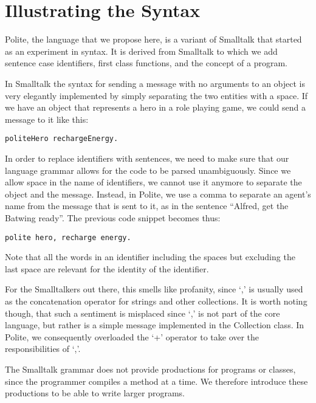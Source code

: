 
\section{Illustrating the Syntax}

Polite, the language that we propose here, is a variant of Smalltalk that started as an experiment in syntax. It is derived from Smalltalk to which we add sentence case identifiers, first class functions, and the concept of a program. 

In Smalltalk the syntax for sending a message with no arguments to an object is very elegantly implemented by simply separating the two entities with a space. If we have an object that represents a hero in a role playing game, we could send a message to it like this: 

\begin{verbatim} 
politeHero rechargeEnergy.
\end{verbatim} 

In order to replace identifiers with sentences, we need to make sure that our language grammar allows for the code to be parsed unambiguously. Since we allow space in the name of identifiers, we cannot use it anymore to separate the object and the message. Instead, in Polite, we use a comma to separate an agent’s name from the message that is sent to it, as in the sentence “Alfred, get the Batwing ready”. The previous code snippet becomes thus: 

\begin{verbatim} 
polite hero, recharge energy. 
\end{verbatim}

Note that all the words in an identifier including the spaces but excluding the last space are relevant for the identity of the identifier.

For the Smalltalkers out there, this smells like profanity, since `,’ is usually used as the concatenation operator for strings and other collections. It is worth noting though, that such a sentiment is misplaced since `,’ is not part of the core language, but rather is a simple message implemented in the Collection class. In Polite, we consequently overloaded the `+’ operator to take over the responsibilities of `,’.

The Smalltalk grammar does not provide productions for programs or classes, since the programmer compiles a method at a time. We therefore introduce these productions to be able to write larger programs.


